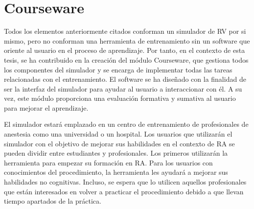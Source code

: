 \section{Courseware}
\label{rasim:courseware}
Todos los elementos anteriormente citados conforman un simulador de \ac{RV} por si mismo, pero no conforman una herramienta de entrenamiento sin un software que oriente al usuario en el proceso de aprendizaje. Por tanto, en el contexto de esta tesis, se ha contribuido en la creación del módulo \ac{Courseware}, que gestiona todos los componentes del simulador y se encarga de implementar todas las tareas relacionadas con el entrenamiento. El software se ha diseñado con la finalidad de ser la interfaz del simulador para ayudar al usuario a interaccionar con él. A su vez, este módulo proporciona una evaluación formativa y sumativa al usuario para mejorar el aprendizaje.





El simulador estará emplazado en un centro de entrenamiento de profesionales de anestesia como una universidad o un hospital. Los usuarios que utilizarán el simulador con el objetivo de mejorar sus habilidades en el contexto de \ac{RA}  se pueden dividir entre estudiantes y profesionales. Los primeros utilizarán la herramienta para empezar su formación en \ac{RA}. Para los usuarios con conocimientos del procedimiento, la herramienta les ayudará a mejorar sus habilidades no cognitivas. Incluso, se espera que lo utilicen aquellos profesionales que están interesados en volver a practicar el procedimiento debido a que llevan tiempo apartados de la práctica.


